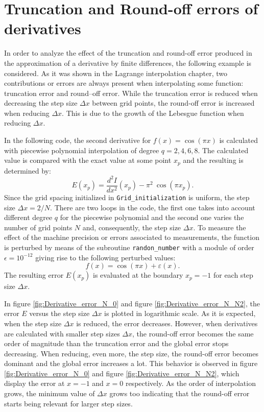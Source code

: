   
 
    \newpage 
    \section{Truncation and Round-off errors of derivatives} 
    
   In order to analyze the effect of the truncation and round-off error produced in the approximation of a derivative by finite differences, the following example is considered. 
   As it was shown in the Lagrange interpolation chapter, two contributions or errors are always present when interpolating some function: truncation error and round--off error. While the truncation error is reduced when decreasing the step size $ \Delta x $ between grid points, the round-off error is increased when reducing $ \Delta x $. This is due to the growth of the Lebesgue function when reducing $ \Delta x $. 
       
   In the following code, the second derivative for $ f(x) = \cos(\pi x)$ is calculated with piecewise polynomial interpolation 
   of degree $ q =2, 4, 6, 8 $. The calculated value is compared with the exact value at some point $ x_p $ and the resulting is determined by: 
   $$
      E(x_p) = \frac{ d^2 I }{ d x^2 } ( x_p ) - \pi^2 \ \cos ( \pi x_p ).
   $$  
   Since the grid spacing initialized in \verb|Grid_initialization| is uniform, the step size $ \Delta x = 2 / N$. There are two loops in the code, the first one takes into account different degree  $ q $  for  the piecewise polynomial  and the second one varies the number of grid points  $ N $ 
   and, consequently, the step size $\Delta x$. To measure the effect of the machine precision or errors associated to measurements, the function is perturbed by means of the subroutine \verb|randon_number| with a module of order
    $ \epsilon = 10^{-12} $ giving rise to the following perturbed values: 
     \begin{equation*}
        	f(x) = \cos(\pi x) + \varepsilon(x).
     \end{equation*}
   The resulting error $ E(x_p)$ is evaluated at the boundary $ x_p = -1 $ for each step size $ \Delta x$.     
    
    In figure  \ref{fig:Derivative_error_N_0} and figure \ref{fig:Derivative_error_N_N2},  the error $ E $ versus the step size $ \Delta x  $ is plotted  in logarithmic scale.  As it is expected,  when the step size $\Delta x$ is reduced, the error decreases. However,  when derivatives are calculated with smaller step sizes $ \Delta x $,  the round-off error becomes the same order of magnitude than the truncation error and the global error stops decreasing. When reducing, even more, the step size, the round-off error becomes dominant and the global error increases a lot.   This behavior is observed in figure \ref{fig:Derivative_error_N_0} and figure \ref{fig:Derivative_error_N_N2}, which display the error at $x=-1$ and $x=0$ respectively. As the order of interpolation grows, the minimum value of $\Delta x$ grows too indicating that the round-off error starts being relevant for larger step sizes.
 

